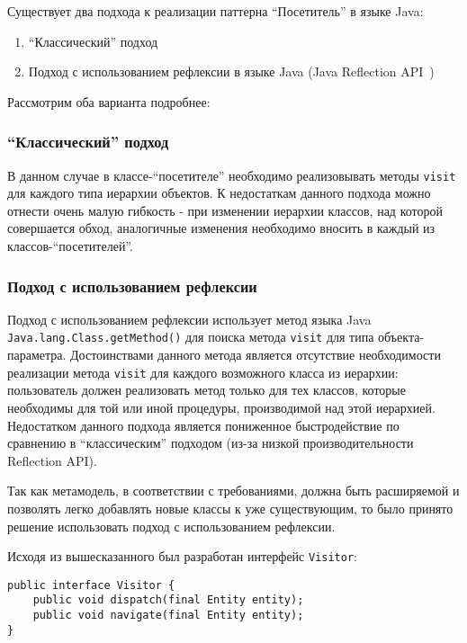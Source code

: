 Существует два подхода к реализации паттерна ``Посетитель'' в языке
Java:

\begin{enumerate}
    \item ``Классический'' подход
    \item Подход с использованием рефлексии в языке Java (Java Reflection
    API~\cite{Gosling2013})
\end{enumerate}

Рассмотрим оба варианта подробнее:

\subsubsection{``Классический'' подход}

В данном случае в классе-``посетителе'' необходимо реализовывать методы
\texttt{visit} для каждого типа иерархии объектов. К недостаткам данного подхода
можно отнести очень малую гибкость - при изменении иерархии классов, над
которой совершается обход, аналогичные изменения необходимо вносить в каждый
из классов-``посетителей''.

\subsubsection{Подход с использованием рефлексии}

Подход с использованием рефлексии использует метод языка Java
\texttt{Java.lang.Class.getMethod()} для поиска метода \texttt{visit} для
типа объекта-параметра. Достоинствами данного метода является отсутствие
необходимости реализации метода \texttt{visit} для каждого возможного класса из
иерархии: пользователь должен реализовать метод только для тех классов, которые
необходимы для той или иной процедуры, производимой над этой иерархией.
Недостатком данного подхода является пониженное быстродействие по сравнению в
``классическим'' подходом (из-за низкой производительности Reflection API).

Так как метамодель, в соответствии с требованиями, должна быть расширяемой и
позволять легко добавлять новые классы к уже существующим, то было принято
решение использовать подход с использованием рефлексии.

Исходя из вышесказанного был разработан интерфейс \texttt{Visitor}:

\begin{lstlisting}[caption={Базовый класс для обхода метамодели}]
public interface Visitor {
    public void dispatch(final Entity entity);
    public void navigate(final Entity entity);
}
\end{lstlisting}


